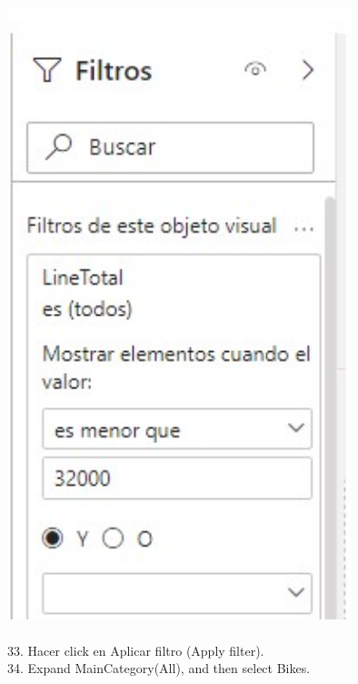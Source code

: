\documentclass[preprint,12pt]{elsarticle}
\begin{document}
\begin{itemize}
				\\ \includegraphics[width=10cm]{./IMAGENES/4.32} \\
			\\ 33. Hacer click en Aplicar filtro (Apply filter).
			\\ 34. Expand MainCategory(All), and then select Bikes.

\end{itemize}
\end{document}
